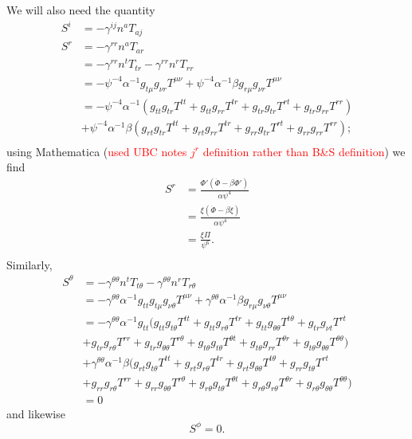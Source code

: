 \documentclass[12pt]{article}
\numberwithin{equation}{section}
\newcommand{\redtext}[1]{\textcolor{red}{#1}}
\begin{document}
We will also need the quantity
\begin{equation}
\begin{aligned}
S^i &= - \gamma^{ij} n^a T_{aj} \\
S^r &= - \gamma^{rr} n^a T_{a r} \\
&= - \gamma^{rr} n^t T_{t r} - \gamma^{rr} n^r T_{r r} \\
&= - \psi^{-4} \alpha^{-1} g_{t \mu} g_{\nu r} T^{\mu \nu} + \psi^{-4} \alpha^{-1} \beta g_{r \mu} g_{\nu r} T^{\mu \nu} \\
&= - \psi^{-4} \alpha^{-1} (g_{t t} g_{t r} T^{t t} + g_{t t} g_{r r} T^{t r} + g_{t r} g_{t r} T^{r t} + g_{t r} g_{r r} T^{r r}) \\
&+ \psi^{-4} \alpha^{-1} \beta (g_{r t} g_{t r} T^{t t} + g_{r t} g_{r r} T^{t r} + g_{r r} g_{t r} T^{r t} + g_{r r} g_{r r} T^{r r}); \\
\end{aligned}
\end{equation}
using Mathematica (\redtext{used UBC notes $j^r$ definition rather than B\&S definition}) we find
\begin{equation}
\begin{aligned}
S^r &= \frac{\Phi' (\dot{\Phi} - \beta \Phi')}{\alpha \psi^4} \\
&= \frac{\xi (\dot{\Phi} - \beta \xi)}{\alpha \psi^4} \\
&= \frac{\xi \Pi}{\psi^6}. \\
\end{aligned}
\end{equation}
Similarly,
\begin{equation}
\begin{aligned}
S^\theta &= - \gamma^{\theta \theta} n^t T_{t \theta} - \gamma^{\theta \theta} n^r T_{r \theta} \\
&= - \gamma^{\theta \theta} \alpha^{-1} g_{tt} g_{t \mu} g_{\nu \theta} T^{\mu \nu} + \gamma^{\theta \theta} \alpha^{-1} \beta g_{r \mu} g_{\nu \theta} T^{\mu \nu} \\
&= - \gamma^{\theta \theta} \alpha^{-1} g_{tt} (g_{t t} g_{t \theta} T^{t t} + g_{t t} g_{r \theta} T^{t r} + g_{t t} g_{\theta \theta} T^{t \theta} + g_{t r} g_{\nu t} T^{r t} \\
&+ g_{t r} g_{r \theta} T^{r r} + g_{t r} g_{\theta \theta} T^{r \theta} + g_{t \theta} g_{t \theta} T^{\theta t} + g_{t \theta} g_{r r} T^{\theta r} + g_{t \theta} g_{\theta \theta} T^{\theta \theta}) \\
&+ \gamma^{\theta \theta} \alpha^{-1} \beta (g_{r t} g_{t \theta} T^{t t} + g_{r t} g_{r \theta} T^{t r} + g_{r t} g_{\theta \theta} T^{t \theta} + g_{r r} g_{t \theta} T^{r t} \\
&+ g_{r r} g_{r \theta} T^{r r} + g_{r r} g_{\theta \theta} T^{r \theta} + g_{r \theta} g_{t \theta} T^{\theta t} + g_{r \theta} g_{r \theta} T^{\theta r} + g_{r \theta} g_{\theta \theta} T^{\theta \theta}) \\
&= 0
\end{aligned}
\end{equation}
and likewise
\begin{equation}
S^\phi = 0.
\end{equation}
\end{document}
